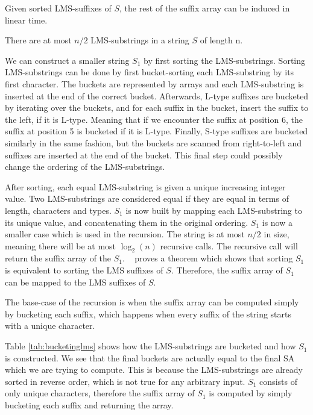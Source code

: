 \begin{theorem}

    Given sorted LMS-suffixes of $S$, the rest of the suffix array can be induced in linear
    time. 

\end{theorem}

\begin{theorem}
    There are at most $n / 2$ LMS-substrings in a string $S$ of length n.
\end{theorem}

We can construct a smaller string $S_1$ by first sorting the LMS-substrings. Sorting
LMS-substrings can be done by first bucket-sorting each LMS-substring by its first
character. The buckets are represented by arrays and each LMS-substring is inserted at the
end of the correct bucket. Afterwards, L-type suffixes are bucketed by iterating over the
buckets, and for each suffix in the bucket, insert the suffix to the left, if it is
L-type. Meaning that if we encounter the suffix at position 6, the suffix at position 5 is
bucketed if it is L-type. Finally, S-type suffixes are bucketed similarly in the same
fashion, but the buckets are scanned from right-to-left and suffixes are inserted at the
end of the bucket. This final step could possibly change the ordering of the
LMS-substrings.

After sorting, each equal LMS-substring is given a unique increasing integer value. Two
LMS-substrings are considered equal if they are equal in terms of length, characters and
types. $S_1$ is now built by mapping each LMS-substring to its unique value, and
concatenating them in the original ordering. $S_1$ is now a smaller case which is used in
the recursion. The string is at most $n / 2$ in size, meaning there will be at most
$\log_2(n)$ recursive calls. The recursive call will return the suffix array of the $S_1$.
~\cite{SuffixArrayConstruction} proves a theorem which shows that sorting $S_1$ is
equivalent to sorting the LMS suffixes of $S$. Therefore, the suffix array of $S_1$ can be
mapped to the LMS suffixes of $S$.

The base-case of the recursion is when the suffix array can be computed simply by
bucketing each suffix, which happens when every suffix of the string starts with a unique
character. 

Table \ref{tab:bucketinglms} shows how the LMS-substrings are bucketed and how $S_1$ is
constructed. We see that the final buckets are actually equal to the final SA which we are
trying to compute. This is because the LMS-substrings are already sorted in reverse order,
which is not true for any arbitrary input. $S_1$ consists of only unique characters,
therefore the suffix array of $S_1$ is computed by simply bucketing each suffix and
returning the array.


